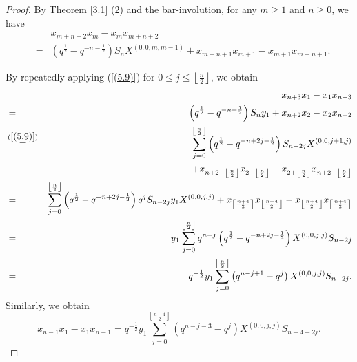 \documentclass[reqno,11pt]{amsart}
\numberwithin{equation}{section}
\begin{document}
\begin{proof}
	By Theorem \ref{3.1} (2) and  the bar-involution, for any $m\ge 1$ and $n\ge 0$, we have\begingroup
\begin{eqnarray}\label{(5.9)}
	&&	x_{m+n+2}x_m-x_mx_{m+n+2}\nonumber\\
	&=&\left(q^{\frac12}-q^{-n-\frac12}\right)
		S_nX^{(0,0,m,m-1)}+x_{m+n+1}x_{m+1}-x_{m+1}x_{m+n+1}.
\end{eqnarray}

By repeatedly applying (\ref{(5.9)}) for $0\le j\le \left\lfloor\frac{n}{2}\right\rfloor$, we obtain
\begin{eqnarray*}
&&	{x_{n + 3}}{x_1} - {x_1}{x_{n + 3}} \\
&=& \left( {{q^{\frac{1}{2}}} - {q^{ - n - \frac{1}{2}}}} \right){S_n}{y_1} + {x_{n + 2}}{x_2} - {x_2}{x_{n + 2}}\\
&\mathop  = \limits^{(\ref{(5.9)})} &\sum\limits_{j = 0}^{ \left\lfloor {\frac{{n }}{2}} \right\rfloor } {\left( {{q^{\frac{1}{2}}} - {q^{ - n + 2j - \frac{1}{2}}}} \right){S_{n - 2j}}{X^{(0,0,j + 1,j)}}}\\
&&  + {x_{n +2- \left\lfloor {\frac{{n}}{2}} \right\rfloor }}{x_{2+ \left\lfloor {\frac{{n }}{2}} \right\rfloor }} - {x_{2 + \left\lfloor {\frac{{n }}{2}} \right\rfloor }}{x_{n+2 - \left\lfloor {\frac{{n }}{2}} \right\rfloor }}\\
&	=& \sum\limits_{j = 0}^{\left\lfloor {\frac{n}{2}} \right\rfloor } {\left( {{q^{\frac{1}{2}}} - {q^{ - n + 2j - \frac{1}{2}}}} \right){q^j}{S_{n - 2j}}{y_1}{X^{(0,0,j,j)}}}  + {x_{\left\lceil {\frac{{n + 4}}{2}} \right\rceil }}{x_{\left\lfloor {\frac{{n + 4}}{2}} \right\rfloor }} - {x_{\left\lfloor {\frac{{n + 4}}{2}} \right\rfloor }}{x_{\left\lceil {\frac{{n + 4}}{2}} \right\rceil }}\\
&	= &{y_1}\sum\limits_{j = 0}^{\left\lfloor {\frac{n}{2}} \right\rfloor } {{q^{n - j}}\left( {{q^{\frac{1}{2}}} - {q^{ - n + 2j - \frac{1}{2}}}} \right){X^{(0,0,j,j)}}{S_{n - 2j}}} \\
	&=& {q^{ - \frac{1}{2}}}{y_1}\sum\limits_{j = 0}^{\left\lfloor {\frac{n}{2}} \right\rfloor } {\left( {{q^{n - j + 1}} - {q^j}} \right){X^{(0,0,j,j)}}{S_{n - 2j}}} .
\end{eqnarray*}
	Similarly, we obtain
\[{x_{n - 1}}{x_1} - {x_1}{x_{n - 1}} = {q^{ - \frac{1}{2}}}{y_1}\sum\limits_{j = 0}^{\left\lfloor {\frac{{n - 4}}{2}} \right\rfloor } {\left( {{q^{n - j - 3}} - {q^j}} \right){X^{(0,0,j,j)}}{S_{n - 4 - 2j}}}. \]
	

\end{proof}
\end{document}

